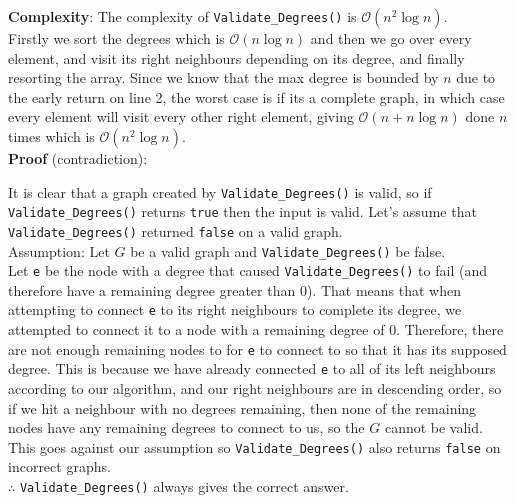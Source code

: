 \documentclass[12pt]{article}
\begin{document}
\textbf{Complexity}: The complexity of \texttt{Validate\_Degrees()} is $\mathcal{O}(n^2\log n)$.\\

Firstly we sort the degrees which is $\mathcal{O}(n\log n)$ and then we go over every element,
and visit its right neighbours depending on its degree, and finally resorting the array.
Since we know that the max degree is bounded by $n$ due to the early return on line 2, the worst case is if its a complete graph,
in which case every element will visit every other right element, giving $\mathcal{O}(n + n\log n)$ done $n$ times which is $\mathcal{O}(n^2\log n)$.\\

\newpage
\textbf{Proof} (contradiction):
\begin{adjustwidth}{10mm}{}
	It is clear that a graph created by \texttt{Validate\_Degrees()} is valid, so if \texttt{Validate\_Degrees()} returns \texttt{true} then the input is valid.
	Let's assume that \texttt{Validate\_Degrees()} returned \texttt{false} on a valid graph.\\

	Assumption: Let $G$ be a valid graph and \texttt{Validate\_Degrees()} be false.\\

	Let \texttt{e} be the node with a degree that caused \texttt{Validate\_Degrees()} to fail (and therefore have a remaining degree greater than 0).
	That means that when attempting to connect \texttt{e} to its right neighbours to complete its degree,
	we attempted to connect it to a node with a remaining degree of 0. Therefore, there are not enough remaining nodes to for \texttt{e} to connect
	to so that it has its supposed degree.
	This is because we have already connected \texttt{e} to all of its left neighbours according to our algorithm,
	and our right neighbours are in descending order, so if we hit a neighbour with no degrees remaining,
	then none of the remaining nodes have any remaining degrees to connect to us, so the $G$ cannot be valid.
	This goes against our assumption so \texttt{Validate\_Degrees()} also returns \texttt{false} on incorrect graphs.\\

	$\therefore$ \texttt{Validate\_Degrees()} always gives the correct answer.
\end{adjustwidth}
\end{document}
